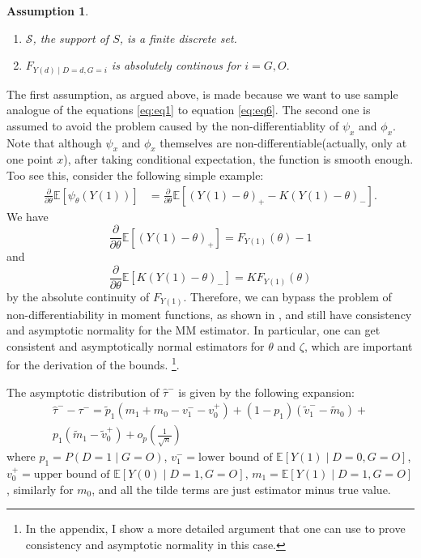 \documentclass[12pt]{article}
\newtheorem{assp}{Assumption}
\newcommand{\Ep}{\mathbb{E}}
\begin{document}
	\begin{assp}

		\begin{enumerate} In deriving the estimator, I make the following assumptions.
			\item $\mathcal{S}$, the support of $S$, is a finite discrete set.
			\item $F_{Y(d) \mid D = d, G = i}$ is absolutely continous for $i = G, O.$
		\end{enumerate}
	\end{assp}

	The first assumption, as argued above, is made because we want to use sample analogue of the equations \ref{eq:eq1} to equation \ref{eq:eq6}. The second one is assumed to avoid the problem caused by the non-differentiablity of $\psi_x$ and $\phi_x$. Note that although $\psi_x$ and $\phi_x$ themselves are non-differentiable(actually, only at one point $x$), after taking conditional expectation, the function is smooth enough. Too see this, consider the following simple example: 
		\begin{align*}
		\frac{\partial}{\partial \theta}\Ep[\psi_{\theta}(Y(1))] & = \frac{\partial}{\partial \theta} \Ep[(Y(1) - \theta)_+ - K (Y(1) - \theta)_-].
		\end{align*}
		We have
		$$\frac{\partial}{\partial \theta} \Ep[(Y(1) - \theta)_+] = F_{Y(1)}(\theta) - 1$$
		and 
		$$\frac{\partial}{\partial \theta} \Ep[K(Y(1) - \theta)_-] = K F_{Y(1)}(\theta) $$
		by the absolute continuity of $F_{Y(1)}$. Therefore, we can bypass the problem of non-differentiability in moment functions, as shown in \textcite{andrews1994asymptotics}, and still have consistency and asymptotic normality for the MM estimator. 
        In particular, one can get consistent and asymptotically normal estimators for $\theta$ and $\zeta$, which are important for the derivation of the bounds. \footnote{In the appendix, I show a more detailed argument that one can use to prove consistency and asymptotic normality in this case.}.
	
	The asymptotic distribution of $\hat{\tau}^-$ is given by the following expansion:
	\begin{equation}\label{eqn:deltamethod}
	    \begin{aligned}
            \hat{\tau}^{-} - \tau^- = \tilde{p}_1 (m_1 + m_0 - v_1^- - v_0^+) + (1- p_1)(\tilde{v}_1^- - \tilde{m}_0) + \\p_1 (\tilde{m}_1 - \tilde{v}_0^+) + o_p(\frac{1}{\sqrt{n}})
        \end{aligned}
	\end{equation}
    where $p_1 = P(D =1 \mid G = O)$, $v_1^- = \text{lower bound of } \mathbb{E}[Y(1) \mid D = 0, G = O]$, $v_0^+ = \text{upper bound of }\mathbb{E}[Y(0) \mid D = 1, G = O]$, $m_1 = \mathbb{E}[Y(1) \mid D = 1, G = O]$, similarly for $m_0$, and all the tilde terms are just estimator minus true value. 
    
\end{document}
